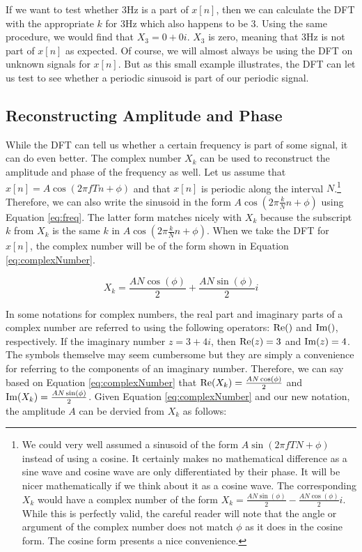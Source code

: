 If we want to test whether 3Hz is a part of $x[n]$, then we can calculate the DFT with the appropriate $k$ for
3Hz which also happens to be 3.  Using the same procedure, we would find that $X_3 = 0 + 0i$.  $X_3$ is
zero, meaning that 3Hz is not part of $x[n]$ as expected.  Of course, we will almost always be using the
DFT on unknown signals for $x[n]$.  But as this small example illustrates, the DFT can let us test to see 
whether a periodic sinusoid is part of our periodic signal.

\subsection*{Reconstructing Amplitude and Phase}

While the DFT can tell us whether a certain frequency is part of some signal, it can do even better.  The complex
number $X_k$ can be used to reconstruct the amplitude and phase of the frequency as well.  Let us assume that
$x[n] = A\cos(2\pi f Tn + \phi)$ and that $x[n]$ is periodic along the interval
 $N$.\footnote{We could very well assumed a sinusoid of the form $A\sin(2\pi fTN + \phi)$ instead of using a 
cosine.  It certainly makes no mathematical difference as a sine wave and cosine wave are only differentiated
by their phase.  It will be nicer mathematically if we think about it as a cosine wave.  The corresponding
$X_k$ would have a complex number of the form $	X_k = \frac{AN\sin(\phi)}{2} - \frac{AN\cos(\phi)}{2}i$. While this is perfectly valid, the careful reader will note that the angle or argument of the complex number
does not match $\phi$ as it does in the cosine form.  The cosine form presents a nice convenience.}  
Therefore, we can also write the sinusoid in the form $A\cos(2 \pi \frac{k}{N} n + \phi)$ using Equation \ref{eq:freq}.  The
latter form matches nicely with $X_k$ because the subscript $k$ from $X_k$ is the same $k$ in 
$A\cos(2 \pi \frac{k}{N} n + \phi)$.  When we take the DFT for $x[n]$,  the complex number will be of the form
shown in Equation \ref{eq:complexNumber}.

\begin{equation}
	\label{eq:complexNumber}
	X_k = \frac{AN\cos(\phi)}{2} + \frac{AN\sin(\phi)}{2}i
\end{equation}

 In some notations for complex numbers, the real part and imaginary parts of a complex number are referred to
 using the following operators: $\mathrm{Re}()$ and $\mathrm{Im}()$, respectively.  If the imaginary number $z = 3 + 4i$, then
 $\mathrm{Re}(z) = 3$ and $\mathrm{Im}(z) = 4$.  The symbols themselve may seem cumbersome but they are
 simply a convenience for referring to the components of an imaginary number.  Therefore, we can say
 based on Equation \ref{eq:complexNumber} that $\mathrm{Re}(X_k) = \frac{AN\cos(\phi)}{2}$ and $\mathrm{Im}(X_k) = 
 \frac{AN\sin(\phi)}{2}$.  Given Equation \ref{eq:complexNumber} and our new notation, the amplitude $A$ 
 can be dervied from $X_k$ as follows:


